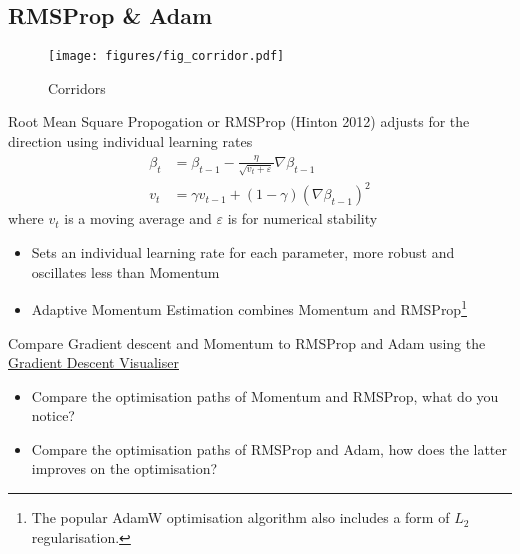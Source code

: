 \documentclass[c]{beamer}
\begin{document}
\subsection{RMSProp \& Adam}

\begin{frame}{\secsubname}
	\begin{figure}
		\begin{minipage}{.59\textwidth}
			\texttt{[image: figures/fig\_corridor.pdf]}
		\end{minipage}
		\hfill
		\begin{minipage}{.39\textwidth}
			\caption{Corridors}
		\end{minipage}
	\end{figure}
\end{frame}

\begin{frame}{\secsubname}
	Root Mean Square Propogation or RMSProp (Hinton 2012) adjusts for the direction using individual learning rates
	\begin{align*}
		\beta_t &= \beta_{t-1} - \frac{\eta}{\sqrt{v_t + \varepsilon}} \nabla \beta_{t-1} \\
		v_t &= \gamma v_{t-1} + (1-\gamma) (\nabla \beta_{t-1})^2
	\end{align*}
	where $v_t$ is a moving average and $\varepsilon$ is for numerical stability
	\begin{itemize}
		\item Sets an individual learning rate for each parameter, more robust and oscillates less than Momentum
		\item Adaptive Momentum Estimation \parencite{Kingma2015} combines Momentum and RMSProp\footnote{The popular AdamW optimisation algorithm \parencite{loshchilov2018} also includes a form of $L_2$ regularisation.}
	\end{itemize}
\end{frame}

\begin{frame}[standout]
	\alert{Compare Gradient descent and Momentum to RMSProp and Adam using the \href{https://github.com/lilipads/gradient_descent_viz}{\underline{Gradient Descent Visualiser}}}
	\normalsize \normalfont
	\begin{itemize}
		\item Compare the optimisation paths of Momentum and RMSProp, what do you notice?
		\item Compare the optimisation paths of RMSProp and Adam, how does the latter improves on the optimisation?
	\end{itemize}
\end{frame}
\end{document}
